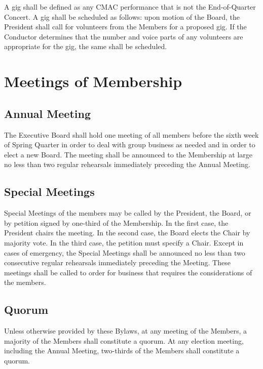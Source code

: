 \documentclass{article}
\begin{document}
A gig shall be defined as any CMAC performance that is not the End-of-Quarter
Concert. A gig shall be scheduled as follows: upon motion of the Board, the
President shall call for volunteers from the Members for a proposed gig. If the
Conductor determines that the number and voice parts of any volunteers are
appropriate for the gig, the same shall be scheduled.

\section{Meetings of Membership}

\subsection{Annual Meeting}

The Executive Board shall hold one meeting of all members before the sixth week
of Spring Quarter in order to deal with group business as needed and in order to
elect a new Board. The meeting shall be announced to the Membership at large no
less than two regular rehearsals immediately preceding the Annual
Meeting.

\subsection{Special Meetings}

Special Meetings of the members may be called by the President, the Board, or by
petition signed by one-third of the Membership. In the first case, the President
chairs the meeting. In the second case, the Board elects the Chair by majority
vote. In the third case, the petition must specify a Chair. Except in cases of
emergency, the Special Meetings shall be announced no less than two consecutive
regular rehearsals immediately preceding the Meeting. These meetings shall be
called to order for business that requires the considerations of the members.

\subsection{Quorum}

Unless otherwise provided by these Bylaws, at any meeting of the Members,
a majority of the Members shall constitute a quorum. At any election
meeting, including the Annual Meeting, two-thirds of the Members shall
constitute a quorum.
\end{document}
